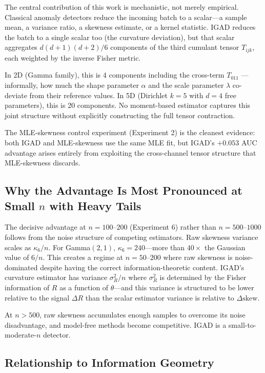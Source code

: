 \documentclass[12pt]{article}
\begin{document}
The central contribution of this work is mechanistic, not merely empirical.
Classical anomaly detectors reduce the incoming batch to a scalar---a sample
mean, a variance ratio, a skewness estimate, or a kernel statistic. IGAD reduces
the batch to a single scalar too (the curvature deviation), but that scalar
aggregates $d(d+1)(d+2)/6$ components of the third cumulant tensor $T_{ijk}$,
each weighted by the inverse Fisher metric.

In 2D (Gamma family), this is 4 components including the cross-term $T_{011}$
--- informally, how much the shape parameter $\alpha$ and the scale parameter
$\lambda$ co-deviate from their reference values. In 5D (Dirichlet $k=5$ with
$d=4$ free parameters), this is 20 components. No moment-based estimator
captures this joint structure without explicitly constructing the full tensor
contraction.

The MLE-skewness control experiment (Experiment 2) is the cleanest evidence:
both IGAD and MLE-skewness use the same MLE fit, but IGAD's $+0.053$ AUC
advantage arises entirely from exploiting the cross-channel tensor structure that
MLE-skewness discards.

\subsection{Why the Advantage Is Most Pronounced at Small $n$ with Heavy Tails}

The decisive advantage at $n=100$--$200$ (Experiment 6) rather than $n=500$--$1000$
follows from the noise structure of competing estimators. Raw skewness variance
scales as $\kappa_6/n$. For Gamma$(2,1)$, $\kappa_6=240$---more than $40\times$
the Gaussian value of $6/n$. This creates a regime at $n=50$--$200$ where raw
skewness is noise-dominated despite having the correct information-theoretic
content. IGAD's curvature estimator has variance $\sigma^2_R/n$ where $\sigma^2_R$
is determined by the Fisher information of $R$ as a function of $\theta$---and
this variance is structured to be lower relative to the signal $\Delta R$ than
the scalar estimator variance is relative to $\Delta\text{skew}$.

At $n>500$, raw skewness accumulates enough samples to overcome its noise
disadvantage, and model-free methods become competitive. IGAD is a
small-to-moderate-$n$ detector.

\subsection{Relationship to Information Geometry}
\end{document}

